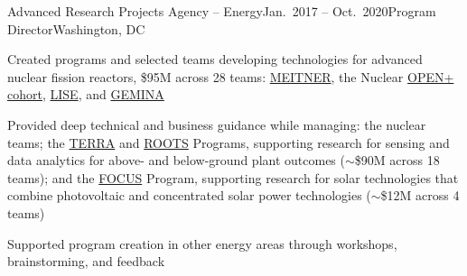 \begin{rSubsection}{Advanced Research Projects Agency -- Energy}{Jan.\ 2017 -- Oct.\ 2020}{Program Director}{Washington, DC}
\item Created programs and selected teams developing technologies for advanced nuclear fission reactors, \$95M across 28 teams: 
\href{https://arpa-e.energy.gov/?q=arpa-e-programs/meitner}{MEITNER}, the
Nuclear
\href{https://arpa-e.energy.gov/?q=news-item/arpa-e-announces-12-million-five-projects-nuclear-materials-science}{OPEN+
cohort},
\href{https://arpa-e.energy.gov/?q=news-item/arpa-e-innovating-through-unconventional-ideas}{LISE}, and  \href{https://arpa-e.energy.gov/technologies/programs/gemina}{GEMINA}
\item Provided deep technical and business guidance while managing: the nuclear teams; the \href{https://arpa-e.energy.gov/?q=arpa-e-programs/terra}{TERRA} and \href{https://arpa-e.energy.gov/?q=arpa-e-programs/roots}{ROOTS} Programs, supporting research for sensing and data analytics for above- and below-ground plant outcomes ($\sim$\$90M across 18 teams); and the \href{https://arpa-e.energy.gov/?q=arpa-e-programs/focus}{FOCUS} Program, supporting research for solar technologies that combine photovoltaic and concentrated solar power technologies ($\sim$\$12M across 4 teams)
\item Supported program creation in other energy areas through workshops, brainstorming, and feedback  
\end{rSubsection}


